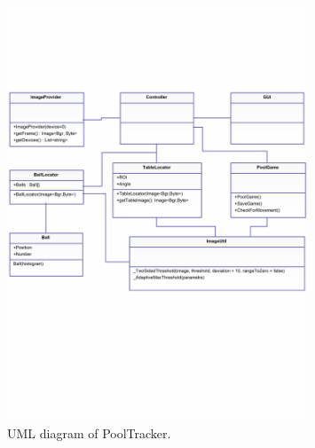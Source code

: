 \begin{figure}[H]
\begin{center}
\leavevmode
\includegraphics[width=0.8\textwidth]{images/UML}
\end{center}
\caption{UML diagram of PoolTracker.}
\label{fig:uml}
\end{figure}

